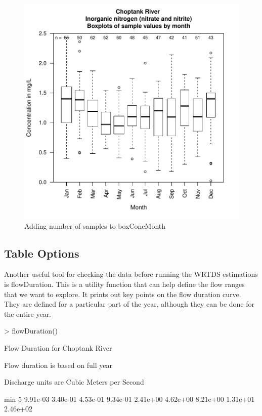 \documentclass[a4paper,11pt]{article}
\begin{document}
\begin{figure}[ht]
\begin{center}

\includegraphics{EGRET-figBox2}
\end{center}
\caption{Adding number of samples to boxConcMonth}
\label{fig:box2}
\end{figure}

\subsection{Table Options}
\label{sec:tableOptionsWQ}
Another useful tool for checking the data before running the WRTDS estimations is flowDuration. This is a utility function that can help define the flow ranges that we want to explore.  It prints out key points on the flow duration curve.  They are defined for a particular part of the year, although they can be done for the entire year.  

\begin{Schunk}
\begin{Sinput}
> flowDuration()
\end{Sinput}
\begin{Soutput}
Flow Duration for Choptank River 

Flow duration is based on full year

Discharge units are Cubic Meters per Second

       min        5%
  9.91e-03  3.40e-01  4.53e-01  9.34e-01  2.41e+00  4.62e+00  8.21e+00  1.31e+01  2.46e+02 
\end{Soutput}
\end{Schunk}
\end{document}
